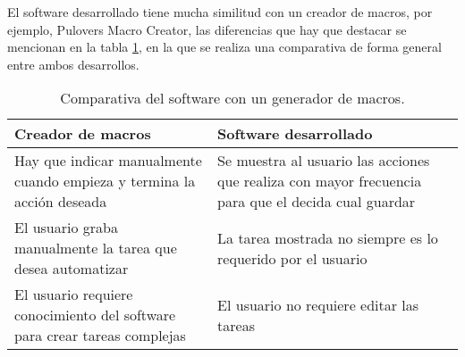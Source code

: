 El software desarrollado tiene mucha similitud con un creador de macros, por 
 ejemplo, Pulovers Macro Creator, las diferencias que hay que destacar se 
 mencionan en la tabla \ref{vsmacros}, en la que se realiza una comparativa de 
 forma general entre ambos desarrollos.
 

\begin{table}[h]
\centering
\begin{tabular}{m{6cm}|m{6cm}}
\hline
Creador de macros 	&	Software desarrollado \\
\hline
Hay que indicar manualmente cuando empieza y termina la acci\'on deseada	
 &	
Se muestra al usuario las acciones que realiza con mayor frecuencia para que
  el decida cual guardar\\
\hline

El usuario graba manualmente la tarea que desea automatizar	
 &
La tarea mostrada no siempre es lo requerido por el usuario\\
\hline

El usuario requiere conocimiento del software para crear tareas complejas 	
 &
El usuario no requiere editar las tareas\\
\hline
\end{tabular}
\caption{Comparativa del software con un generador de macros.}
\label{vsmacros}
\end{table}


